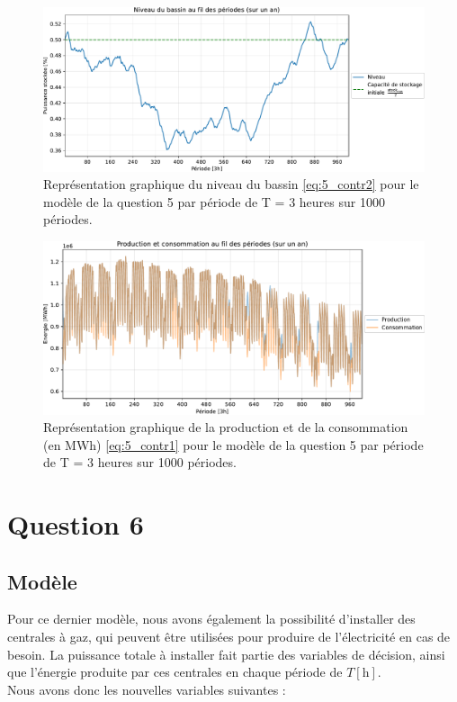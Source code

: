 \documentclass{article}
\newcommand{\unit}[1]{[\mathrm{#1}]}
\begin{document}
\begin{figure}[H]
    \centering
    \includegraphics[scale=0.6]{GraphesP2/Niveau_Bassin_Q5.pdf}
    \caption{Représentation graphique du niveau du bassin \eqref{eq:5_contr2} pour le modèle 
    de la question 5 par période de T = 3 heures sur 1000 périodes.}
    \label{fig:Niveau_bassin_Q5}
\end{figure}

\begin{figure}[H]
    \centering
    \includegraphics[scale=0.6]{GraphesP2/Prod_Cons_Q5.pdf}
    \caption{Représentation graphique de la production et de la consommation (en MWh) 
    \eqref{eq:5_contr1} pour le modèle de la question 5 par période de T = 3 heures sur 1000 périodes.}
    \label{fig:Prod_Cons_Q5}
\end{figure}

\clearpage

\section*{Question 6}

\subsection*{Modèle}
Pour ce dernier modèle, nous avons également la possibilité d'installer des centrales à gaz, qui peuvent être utilisées pour produire de l'électricité en cas de besoin.
La puissance totale à installer fait partie des variables de décision, ainsi que l'énergie produite par ces centrales en chaque période de $T \unit{h}$.\\
Nous avons donc les nouvelles variables suivantes :
\end{document}
